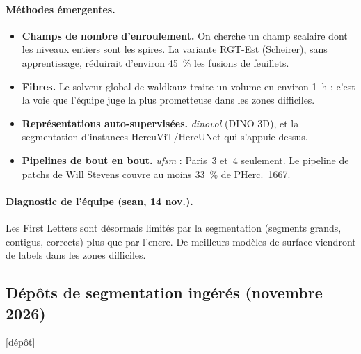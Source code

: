 \documentclass[11pt,a4paper]{article}
\newcommand{\depot}{\textsf{\small[dépôt]}}
\newcommand{\pherc}[1]{PHerc.~#1}
\begin{document}
\paragraph{Méthodes émergentes.}
\begin{itemize}
  \item \textbf{Champs de nombre d'enroulement.} On cherche un champ scalaire dont les
  niveaux entiers sont les spires. La variante RGT-Est (Scheirer), sans apprentissage, réduirait
  d'environ 45~\% les fusions de feuillets.
  \item \textbf{Fibres.} Le solveur global de waldkauz traite un volume en environ 1~h ; c'est
  la voie que l'équipe juge la plus prometteuse dans les zones difficiles.
  \item \textbf{Représentations auto-supervisées.} \emph{dinovol} (DINO 3D), et la segmentation
  d'instances HercuViT/HercUNet qui s'appuie dessus.
  \item \textbf{Pipelines de bout en bout.} \emph{ufsm} : Paris~3 et~4 seulement. Le pipeline
  de patchs de Will Stevens couvre au moins 33~\% de \pherc{1667}.
\end{itemize}

\paragraph{Diagnostic de l'équipe (sean, 14 nov.).} Les First Letters sont désormais limités
par la segmentation (segments grands, contigus, corrects) plus que par l'encre. De meilleurs
modèles de surface viendront de labels dans les zones difficiles.

\subsection{Dépôts de segmentation ingérés (novembre 2026)} \depot
\end{document}
